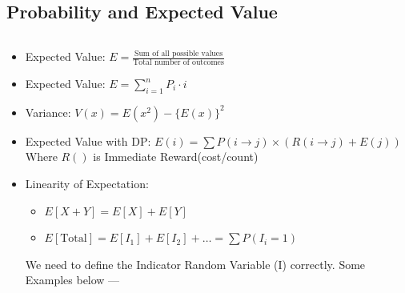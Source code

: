 \subsection{\small Probability and Expected Value  \scriptsize}
\inputminted[breaklines, breakanywhere]{c++}{code/04-Combinatorics and Probability/16-Probability and Expected Value.cpp}

\vspace{-5.5mm}
{\footnotesize
\begin{itemize}
\item Expected Value: $E = \frac{\text{Sum of all possible values}}{\text{Total number of outcomes}}$
\item Expected Value: $E = \sum_{i=1}^{n} P_i \cdot i$
\item Variance: $V(x) = E(x^2) - \{E(x)\}^2$
\item Expected Value with DP: $E(i) = \sum P(i \to j) \times (R(i \to j) + E(j))$ Where $R()$ is Immediate Reward(cost/count)
\item {
    Linearity of Expectation: 
    \begin{itemize}
    \item $E[X + Y] = E[X] + E[Y]$
    \item $E[\text{Total}] = E[I_1] + E[I_2] + \dots = \sum P(I_i=1)$
    \end{itemize}

    We need to define the Indicator Random Variable (I) correctly. Some Examples below —

}
\end{itemize}}
